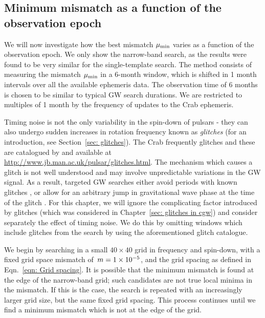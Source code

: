 \documentclass[../full_thesis/full_thesis.tex]{subfiles}
\begin{document}
\subsection{Minimum mismatch as a function of the observation epoch}
\label{sec: Minimum mismatch as a function of the observation epoch}

We will now investigate how the best mismatch $\mu_{\mathrm{min}}$ varies as a function of
the observation epoch. We only show the narrow-band search, as the results were
found to be very similar for the single-template search. The method consists of
measuring the mismatch $\mu_{\mathrm{min}}$ in a 6-month window, which is shifted in 1
month intervals over all the available ephemeris data. The observation time of
6 months is chosen to be similar to typical GW search durations. We are
restricted to multiples of 1 month by the frequency of updates to the Crab
ephemeris.

Timing noise is not the only variability in the spin-down of pulsars - they can
also undergo sudden increases in rotation frequency known as \emph{glitches}
(for an introduction, see Section~\ref{sec: glitches}).
The Crab frequently glitches and these are catalogued by \citet{Espinoza2011}
and available at \url{http://www.jb.man.ac.uk/pulsar/glitches.html}.
The mechanism which causes a glitch is not well understood and may involve
unpredictable variations in the GW signal. As a result, targeted GW searches
either avoid periods with known glitches \citep{abbott2008beating}, or
allow for an arbitrary jump in gravitational wave phase at the time of
the glitch \citep{abbott2010searches}. For this chapter, we will ignore
the complicating factor introduced by glitches (which was considered
in Chapter~\ref{sec: glitches in cgw}) and consider
separately the effect of timing noise. We do this by
omitting windows which include glitches from the search by using
the aforementioned glitch catalogue.

We begin by searching in a small
$40\times40$ grid in frequency and spin-down, with a fixed grid space
mismatch of~$m=1\times10^{-5}$, and the grid spacing as defined in
Eqn.~\eqref{eqn: Grid spacing}. It is possible that the minimum mismatch is
found at the edge of the narrow-band grid; such candidates  are not true local
minima in the mismatch. If this is the case, the search is repeated with an
increasingly larger grid size, but the same fixed grid spacing.  This process
continues until we find a minimum mismatch which is not at the edge of the
grid.
\end{document}
